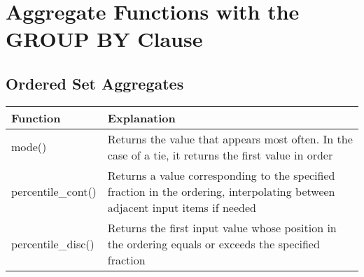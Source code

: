 \section{Aggregate Functions with the GROUP BY Clause}
\subsection{Ordered Set Aggregates}
\begin{table}
    \centering
    \begin{tabularx}{\textwidth}{ll}
        \hline
        Function           & Explanation                                                                                                                   \\
        \hline
        mode()             & Returns the value that appears most often. In the case of a tie, it returns the first value in order                          \\
        percentile\_cont() & Returns a value corresponding to the specified fraction in the ordering, interpolating between adjacent input items if needed \\
        percentile\_disc() & Returns the first input value whose position in the ordering equals or exceeds the specified fraction                         \\
        \hline
    \end{tabularx}
\end{table}
